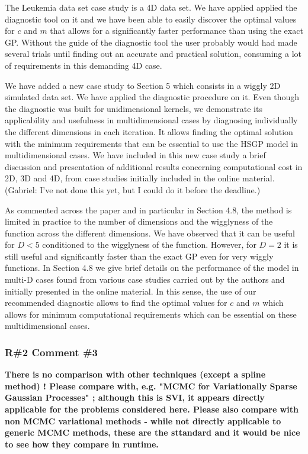 \documentclass[11pt]{report}
\begin{document}
The Leukemia data set case study is a 4D data set. We have applied applied the diagnostic tool on it and we have been able to easily discover the optimal values for $c$ and $m$ that allows for a significantly faster performance than using the exact GP. Without the guide of the diagnostic tool the user probably would had made several trials until finding out an accurate and practical solution, consuming a lot of requirements in this demanding 4D case.

We have added a new case study to Section 5 which consists in a wiggly 2D simulated data set. We have applied the diagnostic procedure on it. Even though the diagnostic was built for unidimensional kernels, we demonstrate its applicability and usefulness in multidimensional cases by diagnosing individually the different dimensions in each iteration. It allows finding the  optimal solution with the minimum requirements that can be essential to use the HSGP model in multidimensional cases. We have included in this new case study a brief discussion and presentation of additional results concerning computational cost in 2D, 3D and 4D, from case studies initially included in the online material. {\color{blue} (Gabriel: I've not done this yet, but I could do it before the deadline.)}

As commented across the paper and in particular in Section 4.8, the method is limited in practice to the number of dimensions and the wigglyness of the function across the different dimensions. We have observed that it can be useful for $D<5$ conditioned to the wigglyness of the function. However, for $D=2$ it is still useful and significantly faster than the exact GP even for very wiggly functions. In Section 4.8 we give brief details on the performance of the model in multi-D cases found from various case studies carried out by the authors and initially presented in the online material. In this sense, the use of our recommended diagnostic allows to find the optimal values for $c$ and $m$ which allows for minimum computational requirements which can be essential on these multidimensional cases.

\subsubsection*{R\#2 Comment \#3}

\textbf{There is no comparison with other techniques (except a spline method) ! Please compare with, e.g. "MCMC for Variationally Sparse Gaussian Processes" ; although this is SVI, it appears directly applicable for the problems considered here. Please also compare with non MCMC variational methods - while not directly applicable to generic MCMC methods, these are the sttandard and it would be nice to see how they compare in runtime.}
\end{document}
